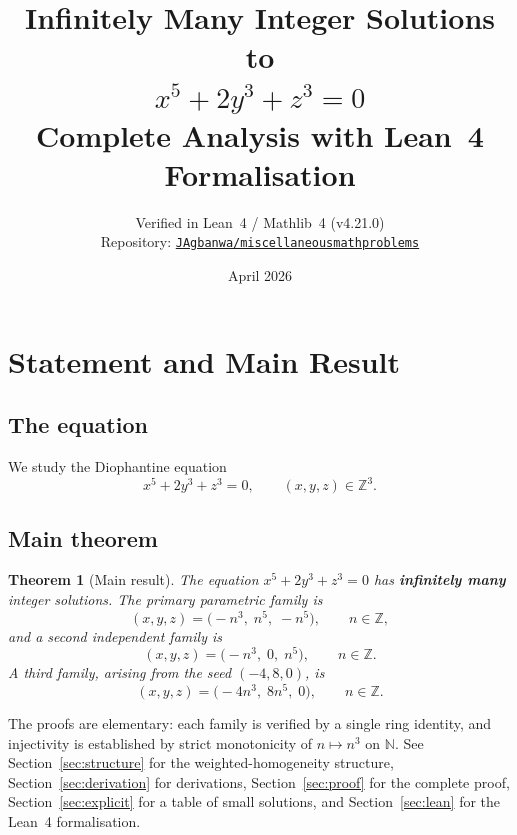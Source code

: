 \documentclass[12pt,a4paper]{article}
\title{%
  \Large\bfseries Infinitely Many Integer Solutions to\\[6pt]
  \Huge $x^5 + 2y^3 + z^3 = 0$\\[10pt]
  \large Complete Analysis with Lean~4 Formalisation
}
\author{%
  \normalsize Verified in Lean~4 / Mathlib~4 (v4.21.0)\\[2pt]
  \normalsize Repository: \href{https://github.com/JAgbanwa/miscellaneousmathproblems}%
    {\texttt{JAgbanwa/miscellaneousmathproblems}}
}
\date{\normalsize April 2026}
\newtheorem{theorem}{Theorem}[section]
\theoremstyle{definition}
\newcommand{\Z}{\mathbb{Z}}
\newcommand{\N}{\mathbb{N}}
\begin{document}
\maketitle
\tableofcontents
\newpage

\section{Statement and Main Result}\label{sec:intro}

\subsection{The equation}

We study the Diophantine equation
\begin{equation}\label{eq:main}
  x^5 + 2y^3 + z^3 = 0, \qquad (x,y,z)\in\Z^3. \tag{$\star$}
\end{equation}

\subsection{Main theorem}

\begin{theorem}[Main result]\label{thm:main}
  The equation $x^5 + 2y^3 + z^3 = 0$ has \textbf{infinitely many} integer solutions.
  The primary parametric family is
  \begin{equation}\label{eq:family1}
    (x, y, z) = \bigl(-n^3,\; n^5,\; -n^5\bigr),
    \qquad n \in \Z,
  \end{equation}
  and a second independent family is
  \begin{equation}\label{eq:family2}
    (x, y, z) = \bigl(-n^3,\; 0,\; n^5\bigr),
    \qquad n \in \Z.
  \end{equation}
  A third family, arising from the seed $(-4, 8, 0)$, is
  \begin{equation}\label{eq:family3}
    (x, y, z) = \bigl(-4n^3,\; 8n^5,\; 0\bigr),
    \qquad n \in \Z.
  \end{equation}
\end{theorem}

The proofs are elementary: each family is verified by a single ring identity,
and injectivity is established by strict monotonicity of $n \mapsto n^3$ on $\N$.
See Section~\ref{sec:structure} for the weighted-homogeneity structure,
Section~\ref{sec:derivation} for derivations,
Section~\ref{sec:proof} for the complete proof,
Section~\ref{sec:explicit} for a table of small solutions,
and Section~\ref{sec:lean} for the Lean~4 formalisation.
\end{document}
